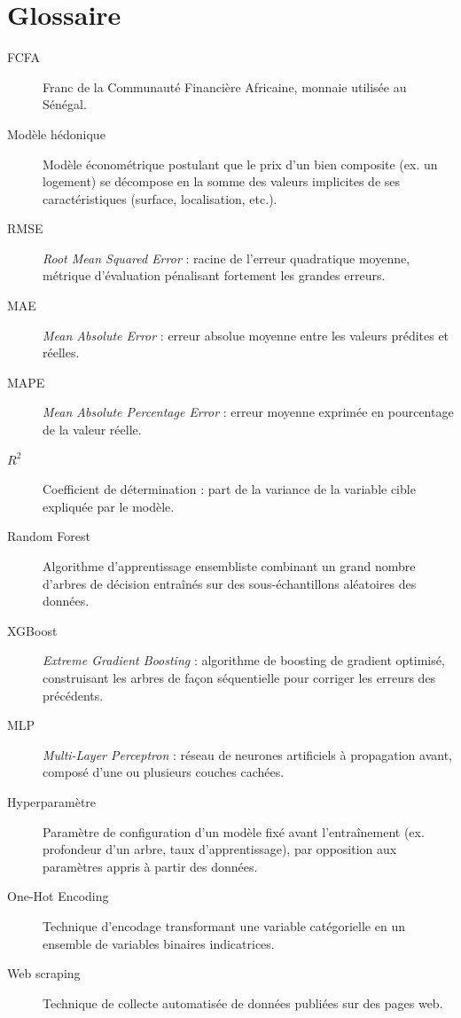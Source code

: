 \chapter*{Glossaire}

\begin{description}
  \item[FCFA] Franc de la Communauté Financière Africaine, monnaie utilisée au Sénégal.
  \item[Modèle hédonique] Modèle économétrique postulant que le prix d'un bien composite (ex. un logement) se décompose en la somme des valeurs implicites de ses caractéristiques (surface, localisation, etc.).
  \item[RMSE] \emph{Root Mean Squared Error} : racine de l'erreur quadratique moyenne, métrique d'évaluation pénalisant fortement les grandes erreurs.
  \item[MAE] \emph{Mean Absolute Error} : erreur absolue moyenne entre les valeurs prédites et réelles.
  \item[MAPE] \emph{Mean Absolute Percentage Error} : erreur moyenne exprimée en pourcentage de la valeur réelle.
  \item[$R^2$] Coefficient de détermination : part de la variance de la variable cible expliquée par le modèle.
  \item[Random Forest] Algorithme d'apprentissage ensembliste combinant un grand nombre d'arbres de décision entraînés sur des sous-échantillons aléatoires des données.
  \item[XGBoost] \emph{Extreme Gradient Boosting} : algorithme de boosting de gradient optimisé, construisant les arbres de façon séquentielle pour corriger les erreurs des précédents.
  \item[MLP] \emph{Multi-Layer Perceptron} : réseau de neurones artificiels à propagation avant, composé d'une ou plusieurs couches cachées.
  \item[Hyperparamètre] Paramètre de configuration d'un modèle fixé avant l'entraînement (ex. profondeur d'un arbre, taux d'apprentissage), par opposition aux paramètres appris à partir des données.
  \item[One-Hot Encoding] Technique d'encodage transformant une variable catégorielle en un ensemble de variables binaires indicatrices.
  \item[Web scraping] Technique de collecte automatisée de données publiées sur des pages web.
\end{description}
